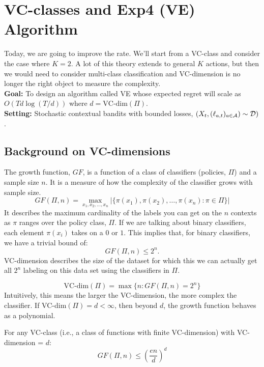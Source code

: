 \documentclass[11pt]{article}
\begin{document}
\section{VC-classes and Exp4 (VE) Algorithm \cite{beygelzimer2011contextual}}
Today, we are going to improve the rate. We'll start from a VC-class and consider the case where $K=2$. A lot of this theory extends to general $K$ actions, but then we would need to consider multi-class classification and VC-dimension is no longer the right object to measure the complexity. \hfill
\newline \\
\textbf{Goal:} To design an algorithm called VE whose expected regret will scale as $O(Td\log(T/d))$ where $d = \text{VC-dim}(\Pi)$. \hfill
\newline\\
\textbf{Setting:} Stochastic contextual bandits with bounded losses, $(X_t,(\ell_{a,t})_{a\in\mathcal{A}})\sim\mathcal{D})$. 



\subsection{Background on VC-dimensions}
The growth function, $GF$, is a function of a class of classifiers (policies, $\Pi$) and a sample size $n$. It is a measure of how the complexity of the classifier grows with sample size.
\begin{equation}
GF(\Pi,n) = \max_{x_1,x_2,\ldots, x_n} | \{\pi(x_1),\pi(x_2),\ldots,\pi(x_n): \pi \in \Pi\}|
\end{equation}
It describes the maximum cardinality of the labels you can get on the $n$ contexts as $\pi$ ranges over the policy class, $\Pi$. If we are talking about binary classifiers, each element $\pi(x_i)$ takes on a $0$ or $1$. This implies that, for binary classifiers, we have a trivial bound of: 
$$
GF(\Pi,n) \le 2^n.
$$
VC-dimension describes the size of the dataset for which this we can actually get all $2^n$ labeling on this data set using the classifiers in $\Pi$.

\begin{equation}
\text{VC-dim}(\Pi) = \max \{n: GF(\Pi,n) = 2^n\}
\end{equation}
Intuitively, this means the larger the VC-dimension, the more complex the classifier. If VC-dim$(\Pi) = d < \infty$, then beyond $d$, the growth function behaves as a polynomial. 

For any VC-class (i.e., a class of functions with finite VC-dimension) with VC-dimension = $d$:
\begin{equation}\label{eq: growth function bound}
GF(\Pi, n) \le \left(\frac{en}{d}\right)^d
\end{equation}
\end{document}
